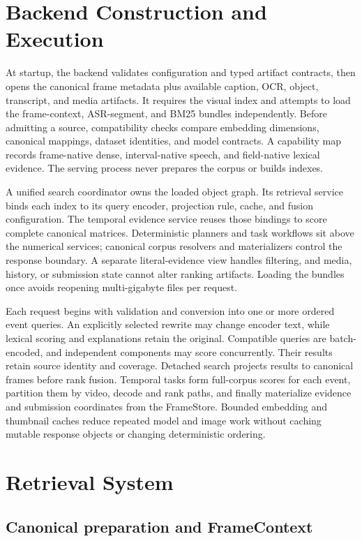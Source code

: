 \section{Backend Construction and Execution}

At startup, the backend validates configuration and typed artifact contracts,
then opens the canonical frame metadata plus available caption, OCR, object,
transcript, and media artifacts. It requires the visual index and attempts to load
the frame-context, ASR-segment, and BM25 bundles independently. Before admitting
a source, compatibility checks compare embedding dimensions, canonical mappings,
dataset identities, and model contracts. A capability map records frame-native
dense, interval-native speech, and field-native lexical evidence. The serving
process never prepares the corpus or builds indexes.

A unified search coordinator owns the loaded object graph. Its retrieval service
binds each index to its query encoder, projection rule, cache, and fusion
configuration. The temporal evidence service reuses those bindings to score
complete canonical matrices. Deterministic planners and task workflows sit above
the numerical services; canonical corpus resolvers and materializers control the
response boundary. A separate literal-evidence view handles filtering, and
media, history, or submission state cannot alter ranking artifacts. Loading the
bundles once avoids reopening multi-gigabyte files per request.

Each request begins with validation and conversion into one or more ordered event
queries. An explicitly selected rewrite may change encoder text, while lexical
scoring and explanations retain the original. Compatible queries are
batch-encoded, and independent components may score concurrently. Their results
retain source identity and coverage. Detached search projects results to canonical
frames before rank fusion. Temporal tasks
form full-corpus scores for each event, partition them by video, decode and rank
paths, and finally materialize evidence and submission coordinates from the
FrameStore. Bounded embedding and thumbnail caches reduce repeated model and
image work without caching mutable response objects or changing deterministic
ordering.

\section{Retrieval System}

\subsection{Canonical preparation and FrameContext}

